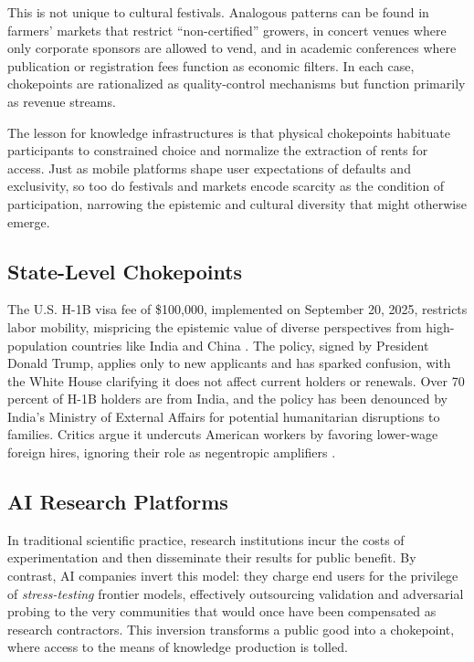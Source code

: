 \documentclass[12pt]{article}
\theoremstyle{remark}
\begin{document}
This is not unique to cultural festivals. Analogous patterns can be found in farmers' markets that restrict “non-certified” 
growers, in concert venues where only corporate sponsors are allowed to vend, and in academic conferences where 
publication or registration fees function as economic filters. In each case, chokepoints are rationalized as 
quality-control mechanisms but function primarily as revenue streams. 

The lesson for knowledge infrastructures is that physical chokepoints habituate participants to constrained choice and 
normalize the extraction of rents for access. Just as mobile platforms shape user expectations of defaults and exclusivity, 
so too do festivals and markets encode scarcity as the condition of participation, narrowing the epistemic and cultural 
diversity that might otherwise emerge.


\subsection{State-Level Chokepoints}
The U.S. H-1B visa fee of \$100,000, implemented on September 20, 2025, restricts labor mobility, mispricing the epistemic value of diverse perspectives from high-population countries like India and China \citep{cbc2025trumpvisa}. The policy, signed by President Donald Trump, applies only to new applicants and has sparked confusion, with the White House clarifying it does not affect current holders or renewals. Over 70 percent of H-1B holders are from India, and the policy has been denounced by India's Ministry of External Affairs for potential humanitarian disruptions to families. Critics argue it undercuts American workers by favoring lower-wage foreign hires, ignoring their role as negentropic amplifiers \citep{cbc2025trumpvisa}.

\subsection{AI Research Platforms}
In traditional scientific practice, research institutions incur the costs of experimentation and then disseminate their results for public benefit. 
By contrast, AI companies invert this model: they charge end users for the privilege of \emph{stress-testing} frontier models, effectively outsourcing 
validation and adversarial probing to the very communities that would once have been compensated as research contractors. 
This inversion transforms a public good into a chokepoint, where access to the means of knowledge production is tolled. 
\end{document}
